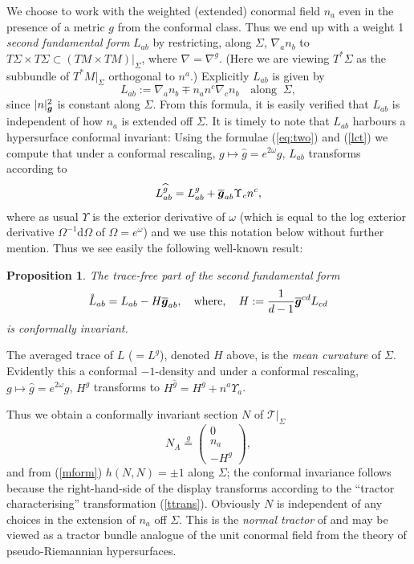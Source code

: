 \documentclass[a4paper,12pt]{amsart}
\newcommand{\cT}{{\mathcal T}}
\def\bg{\mbox{\boldmath $g$}}
\newcommand{\om}{\omega}
\newtheorem{proposition}[theorem]{Proposition}
\theoremstyle{remark}
\newcommand{\nn}[1]{(\ref{#1})}
\begin{document}
We choose to work with the weighted (extended) conormal field $n_a$ even in the presence of a metric $g$ from the conformal class. Thus we end up with a weight 1 {\em second fundamental form} $L_{ab}$ by restricting, along $\Sigma$, $\nabla_a n_b$ to
$T\Sigma\times T\Sigma\subset (TM\times TM)|_\Sigma$, where $\nabla=\nabla^g$. (Here we are viewing $T^*\Sigma$ as the subbundle of $T^*M|_\Sigma$ orthogonal to $n^a$.) Explicitly $L_{ab}$ is given by
$$
L_{ab}:=\nabla_a n_b\mp n_an^c\nabla_c n_b   \quad \mbox{along }~\Sigma ,
$$ 
since $|n|^2_{\mbox{\boldmath{\scriptsize$ g$}}}$ is constant along $\Sigma$.   From this formula, it is easily verified that $L_{ab}$ is independent of how $n_a$ is extended off $\Sigma$. It is timely to note that $L_{ab}$ harbours a hypersurface conformal invariant: Using the formulae \nn{eq:two} and \nn{lct} we compute that under a conformal rescaling, $g\mapsto \widehat{g}=e^{2\om} g$, $L_{ab}$ transforms according to 
$$
L^{\widehat{g}}_{ab}=L^g_{ab}+\overline{\bg}_{ab}\Upsilon_cn^c,
$$
where as usual $\Upsilon$ is the exterior derivative of $\omega$ (which is equal to the log exterior derivative $\Omega^{-1}\mathrm{d}\Omega$ of $\Omega=e^\omega$) and we use this notation below without further mention. 
Thus we see easily the following well-known result:
\begin{proposition}\label{tf2}
The trace-free part of the second fundamental form 
$$
\mathring{L}_{ab}= L_{ab}-H\overline{\bg}_{ab}, \quad \mbox{where}, \quad H:= \frac{1}{d-1}\overline{\bg}^{cd}L_{cd} 
$$ 
is conformally invariant.
\end{proposition} 
The averaged trace of $L$ ($=L^g$), denoted $H$ above, is the {\em mean curvature} of $\Sigma$. Evidently this a conformal $-1$-density and under a conformal rescaling, $g\mapsto \widehat{g}=e^{2\om} g$, $H^g$ transforms to $H^{\widehat{g}}=H^g+n^a\Upsilon_a$.

Thus we obtain a conformally invariant section $N$ of $\cT|_\Sigma$
$$
N_A \stackrel{g}{=}\left(\begin{array}{c}0\\
n_a\\
-H^g\end{array}\right),
$$ 
and from \nn{mform} $h(N,N)=\pm 1$ along $\Sigma$; the conformal invariance follows because the right-hand-side of the display transforms according to the ``tractor characterising'' transformation \nn{ttrans}.  Obviously $N$ is independent of any choices in the extension of $n_a$ off
$\Sigma$. This is the {\em normal tractor} of \cite{BEG} and may be
viewed as a tractor bundle analogue of the unit conormal field from
the theory of pseudo-Riemannian hypersurfaces. 
\end{document}
